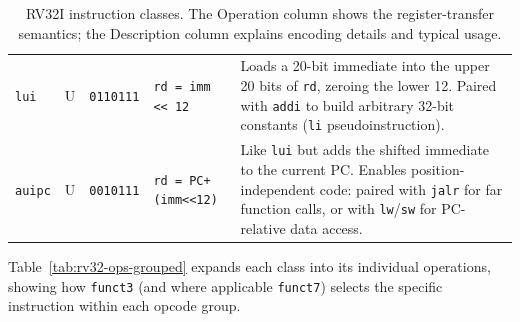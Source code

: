 \documentclass[9pt, a4paper]{extarticle}
\begin{document}
\begin{table}[htbp]
{\begin{tabular}{@{} l | l | l | l | p{7.8cm} @{}}
    \texttt{lui} & U & \texttt{0110111} &
        \texttt{rd = imm << 12} &
        Loads a 20-bit immediate into the upper 20 bits of \texttt{rd}, zeroing the lower 12. Paired with \texttt{addi} to build arbitrary 32-bit constants (\texttt{li} pseudoinstruction). \\[2pt]
    \texttt{auipc} & U & \texttt{0010111} &
        \texttt{rd = PC+(imm<<12)} &
        Like \texttt{lui} but adds the shifted immediate to the current PC. Enables position-independent code: paired with \texttt{jalr} for far function calls, or with \texttt{lw}/\texttt{sw} for PC-relative data access. \\
    \bottomrule
\end{tabular}}
\caption{RV32I instruction classes. The Operation column shows the register-transfer semantics; the Description column explains encoding details and typical usage.}
\label{tab:rv32-opcodes}
\end{table}

Table~\ref{tab:rv32-ops-grouped} expands each class into its individual operations, showing how \texttt{funct3} (and where applicable \texttt{funct7}) selects the specific instruction within each opcode group.
\end{document}
